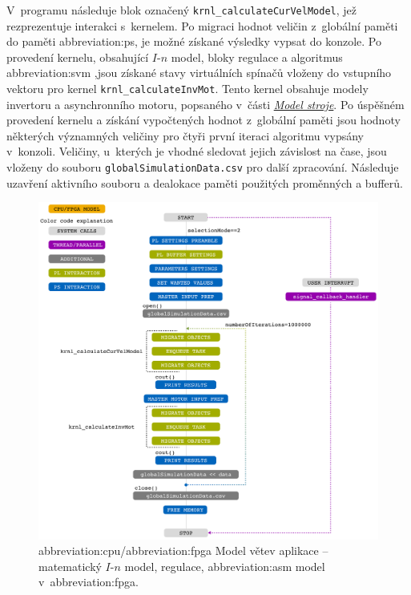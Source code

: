 \documentclass[a4paper, twoside, 11pt]{article}
\begin{document}
			V~programu následuje blok označený \texttt{krnl\_calculateCurVelModel}, jež rezprezentuje interakci s~kernelem. Po migraci hodnot veličin z~globální paměti do paměti \gls{abbreviation:ps}, je možné získané výsledky vypsat do konzole. Po provedení kernelu, obsahující $I$-$n$ model, bloky regulace a algoritmus \gls{abbreviation:svm} ,jsou získané stavy virtuálních spínačů vloženy do vstupního vektoru pro kernel \texttt{krnl\_calculateInvMot}. Tento kernel obsahuje modely invertoru a asynchronního motoru, popsaného v~části \hyperref[sec:model-stroje]{\textit{Model stroje}}. Po úspěšném provedení kernelu a získání vypočtených hodnot z~globální paměti jsou hodnoty některých významných veličiny pro čtyři první iteraci algoritmu vypsány v~konzoli. Veličiny, u~kterých je vhodné sledovat jejich závislost na čase, jsou vloženy do souboru \texttt{globalSimulationData.csv} pro další zpracování. Následuje uzavření aktivního souboru a dealokace paměti použitých proměnných a bufferů.

			\begin{figure}[htbp!]
				\centering
				\includegraphics[width=1\textwidth]{src/pdf/cpu-fpga-model.pdf}
				\caption{\gls{abbreviation:cpu}/\gls{abbreviation:fpga} Model větev aplikace – matematický $I$-$n$ model, regulace, \gls{abbreviation:asm} model v~\gls{abbreviation:fpga}.}
				\label{fig:cpu-fpga-model}
			\end{figure}	 
\end{document}

